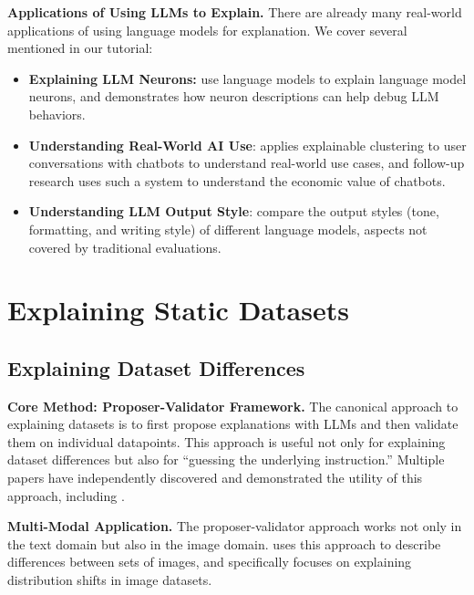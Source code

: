 \documentclass[12pt]{article}
\begin{document}
\noindent \textbf{Applications of Using LLMs to Explain.}
There are already many real-world applications of using language models for explanation.
We cover several mentioned in our tutorial:
\begin{itemize}
    \item \textbf{Explaining LLM Neurons:} \citet{choi2024automatic, bills2023language} use language models to explain language model neurons, and \citet{meng2024monitor} demonstrates how neuron descriptions can help debug LLM behaviors.
    \item \textbf{Understanding Real-World AI Use}: \citet{tamkin2024clio} applies explainable clustering to user conversations with chatbots to understand real-world use cases, and follow-up research \cite{handa2025economic} uses such a system to understand the economic value of chatbots. 
    \item \textbf{Understanding LLM Output Style}: \citet{dunlap2025vibecheck, sun2025idiosyncrasies} compare the output styles (tone, formatting, and writing style) of different language models, aspects not covered by traditional evaluations. 
\end{itemize}

\section{Explaining Static Datasets}

\subsection{Explaining Dataset Differences}

\noindent \textbf{Core Method: Proposer-Validator Framework.}
The canonical approach to explaining datasets is to first propose explanations with LLMs and then validate them on individual datapoints.
This approach is useful not only for explaining dataset differences but also for ``guessing the underlying instruction.''
Multiple papers have independently discovered and demonstrated the utility of this approach, including \citet{singh2022explaining, zhou2022large, zhong2023goal, zhong2022describing, honovich2022instruction}.

\noindent \textbf{Multi-Modal Application.} 
The proposer-validator approach works not only in the text domain but also in the image domain.
\citet{dunlap2023describing} uses this approach to describe differences between sets of images, and \citet{zhu2022gsclip} specifically focuses on explaining distribution shifts in image datasets. 
\end{document}
